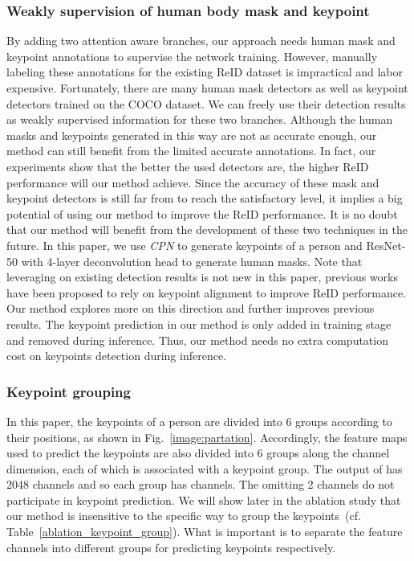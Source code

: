 \documentclass[10pt,twocolumn,letterpaper]{article}
\begin{document}
\subsubsection{Weakly supervision of human body mask and keypoint} 
By adding two attention aware branches, our approach needs human mask and keypoint annotations to supervise the network training. However, manually labeling these annotations for the existing ReID dataset is impractical and labor expensive. Fortunately, there are many human mask detectors as well as keypoint detectors trained on the COCO dataset. We can freely use their detection results as weakly supervised information for these two branches. Although the human masks and keypoints generated in this way are not as accurate enough, our method can still benefit from the limited accurate annotations. In fact, our experiments show that the better the used detectors are, the higher ReID performance will our method achieve. Since the accuracy of these mask and keypoint detectors is still far from to reach the satisfactory level, it implies a big potential of using our method to improve the ReID performance. It is no doubt that our method will benefit from the development of these two techniques in the future. In this paper, we use \textit{CPN}\cite{chen2018cascaded} to generate keypoints of a person and ResNet-50 with 4-layer deconvolution head to generate human masks. Note that leveraging on existing detection results is not new in this paper, previous works~\cite{su2017pose} have been proposed to rely on keypoint alignment to improve ReID performance. Our method explores more on this direction and further improves previous results. The keypoint prediction in our method is only added in training stage and removed during inference. Thus, our method needs no extra computation cost on keypoints detection during inference.


\subsubsection{Keypoint grouping}
In this paper, the keypoints of a person are divided into 6 groups according to their positions, as shown in Fig.~\ref{image:partation}. Accordingly, the feature maps used to predict the keypoints are also divided into 6 groups along the channel dimension, each of which is associated with a keypoint group. The output of  has 2048 channels and so each group has  channels. The omitting 2 channels do not participate in keypoint prediction. We will show later in the ablation study that our method is insensitive to the specific way to group the keypoints~(cf. Table~\ref{ablation_keypoint_group}). What is important is to separate the feature channels into different groups for predicting keypoints respectively.
\end{document}
